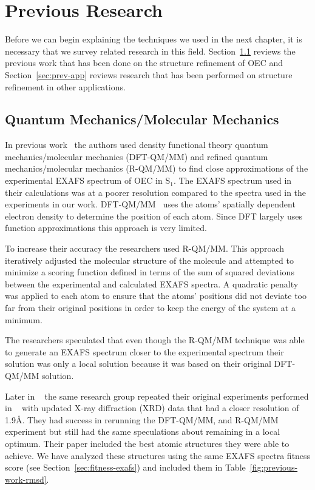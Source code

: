 \chapter{Previous Research}

Before we can begin explaining the techniques we used in the next chapter, it is necessary that we survey related research in this field. Section~\ref{sec:prev-work} reviews the previous work that has been done on the structure refinement of OEC and Section~\ref{sec:prev-app} reviews research that has been performed on structure refinement in other applications.

\section{Quantum Mechanics/Molecular Mechanics}
\label{sec:prev-work}

In previous work~\cite{sproviero2008model} the authors used density functional theory quantum mechanics/molecular mechanics (DFT-QM/MM) and refined quantum mechanics/molecular mechanics (R-QM/MM) to find close approximations of the experimental EXAFS spectrum of OEC in S$_{1}$. The EXAFS spectrum used in their calculations was at a poorer resolution compared to the spectra used in the experiments in our work. DFT-QM/MM~\cite{parr1989density} uses the atoms' spatially dependent electron density to determine the position of each atom. Since DFT largely uses function approximations this approach is very limited.

To increase their accuracy the researchers used R-QM/MM. This approach iteratively adjusted the molecular structure of the molecule and attempted to minimize a scoring function defined in terms of the sum of squared deviations between the experimental and calculated EXAFS spectra. A quadratic penalty was applied to each atom to ensure that the atoms' positions did not deviate too far from their original positions in order to keep the energy of the system at a minimum.

The researchers speculated that even though the R-QM/MM technique was able to generate an EXAFS spectrum closer to the experimental spectrum their solution was only a local solution because it was based on their original DFT-QM/MM solution.

Later in ~\cite{luber2011s1} the same research group repeated their original experiments performed in ~\cite{sproviero2008model} with updated X-ray diffraction (XRD) data that had a closer resolution of 1.9\AA. They had success in rerunning the DFT-QM/MM, and R-QM/MM experiment but still had the same speculations about remaining in a local optimum. Their paper included the best atomic structures they were able to achieve. We have analyzed these structures using the same EXAFS spectra fitness score (see Section~\ref{sec:fitness-exafs}) and included them in Table~\ref{fig:previous-work-rmsd}. 

